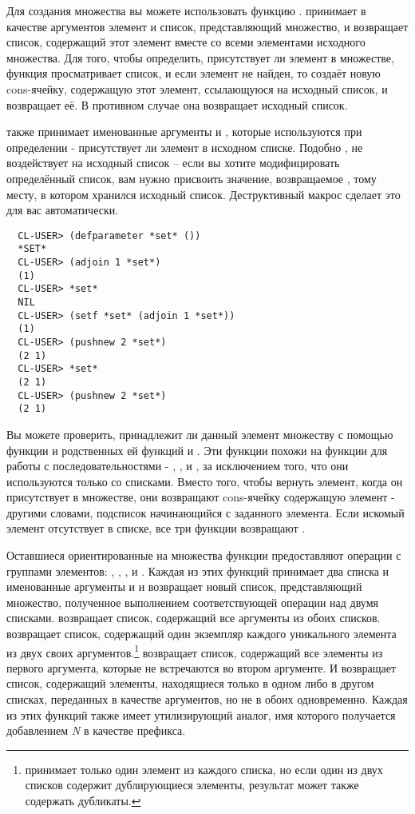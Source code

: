 Для создания множества вы можете использовать функцию . 
принимает в качестве аргументов элемент и список, представляющий множество, и возвращает
список, содержащий этот элемент вместе со всеми элементами исходного множества.  Для того,
чтобы определить, присутствует ли элемент в множестве, функция просматривает список, и
если элемент не найден, то  создаёт новую cons-ячейку, содержащую этот
элемент, ссылающуюся на исходный список, и возвращает её. В противном случае она
возвращает исходный список.

 также принимает именованные аргументы  и , которые
используются при определении - присутствует ли элемент в исходном списке. Подобно
,  не воздействует на исходный список -- если вы хотите
модифицировать определённый список, вам нужно присвоить значение, возвращаемое
, тому месту, в котором хранился исходный список. Деструктивный макрос
 сделает это для вас автоматически.

\begin{verbatim}
  CL-USER> (defparameter *set* ())
  *SET*
  CL-USER> (adjoin 1 *set*)
  (1)
  CL-USER> *set*
  NIL
  CL-USER> (setf *set* (adjoin 1 *set*))
  (1)
  CL-USER> (pushnew 2 *set*)
  (2 1)
  CL-USER> *set*
  (2 1)
  CL-USER> (pushnew 2 *set*)
  (2 1)
\end{verbatim}

Вы можете проверить, принадлежит ли данный элемент множеству с помощью функции
 и родственных ей функций  и . Эти
функции похожи на функции для работы с последовательностями - , ,
и , за исключением того, что они используются только со списками. Вместо
того, чтобы вернуть элемент, когда он присутствует в множестве, они возвращают cons-ячейку
содержащую элемент - другими словами, подсписок начинающийся с заданного элемента. Если
искомый элемент отсутствует в списке, все три функции возвращают .

Оставшиеся ориентированные на множества функции предоставляют операции с группами
элементов: , , , и
.  Каждая из этих функций принимает два списка и именованные
аргументы  и  и возвращает новый список, представляющий множество,
полученное выполнением соответствующей операции над двумя списками. 
возвращает список, содержащий все аргументы из обоих списков.  возвращает
список, содержащий один экземпляр каждого уникального элемента из двух своих
аргументов.\footnote{ принимает только один элемент из каждого списка, но если
  один из двух списков содержит дублирующиеся элементы, результат может также содержать
  дубликаты.}  возвращает список, содержащий все элементы из первого
аргумента, которые не встречаются во втором аргументе. И 
возвращает список, содержащий элементы, находящиеся только в одном либо в другом списках,
переданных в качестве аргументов, но не в обоих одновременно. Каждая из этих функций также
имеет утилизирующий аналог, имя которого получается добавлением \textit{N} в качестве
префикса.

